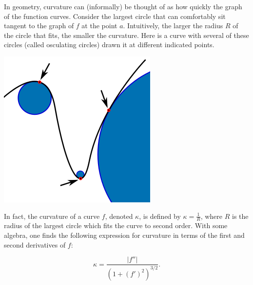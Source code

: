 \documentclass[twoside,openright,titlepage,a4paper]{book}
\begin{document}
\begin{sloppypar}
In geometry, curvature can (informally) be thought of as how quickly the graph of the function curves. Consider the largest circle that can comfortably sit tangent to the graph of $f$ at the point $a$. Intuitively, the larger the radius $R$ of the circle that fits, the smaller the curvature. Here is a curve with several of these circles (called osculating circles) drawn it at different indicated points.
\begin{center}\includegraphics[scale=0.6]{Curvature}\end{center}

In fact, the curvature of a curve $f$, denoted $\kappa$, is defined by $\kappa = \frac{1}{R}$, where $R$ is the radius of the largest circle which fits the curve to second order. With some algebra, one finds the following expression for curvature in terms of the first and second derivatives of $f$:

\begin{definitionbox}[title=\textbf{Curvature of a function $f$}]
	\[ \kappa = \frac{|f''|}{(1+(f')^2)^{3/2}}. \]
\end{definitionbox}
	

\end{sloppypar}
\end{document}
